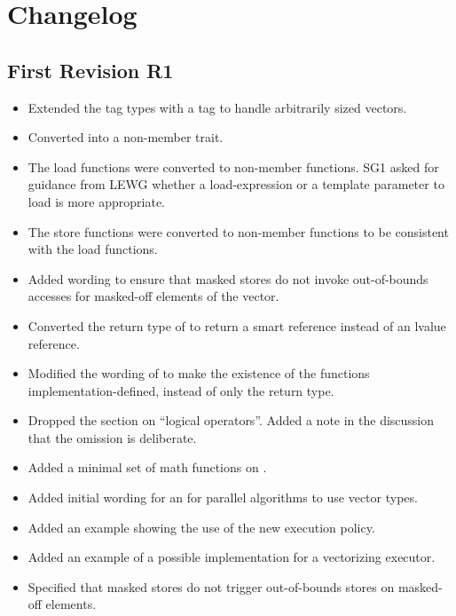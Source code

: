 \section{Changelog}
\subsection{First Revision R1}
\begin{itemize}
  \item Extended the  tag types with a  tag to handle arbitrarily sized vectors.
  \item Converted  into a non-member trait.
  \item The load functions were converted to non-member functions.
    SG1 asked for guidance from LEWG whether a load-expression or a template parameter to load is more appropriate.
  \item The store functions were converted to non-member functions to be consistent with the load functions.
  \item Added wording to ensure that masked stores do not invoke out-of-bounds accesses for masked-off elements of the vector.
  \item Converted the return type of \datapar{} to return a smart reference instead of an lvalue reference.
  \item Modified the wording of  to make the existence of the functions implementation-defined, instead of only the return type.
  \item Dropped the section on “\datapar logical operators”. Added a note in the discussion that the omission is deliberate.
  \item Added a minimal set of math functions on \datapar.
  \item Added initial wording for an  for parallel algorithms to use vector types.
  \item Added an example showing the use of the new execution policy.
  \item Added an example of a possible  implementation for a vectorizing executor.
  \item Specified that masked stores do not trigger out-of-bounds stores on masked-off elements.
\end{itemize}





